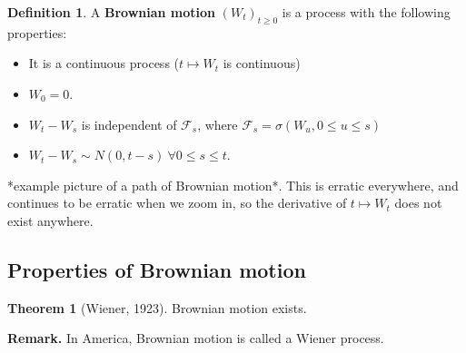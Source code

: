 \documentclass{article}
\theoremstyle{definition}
\newtheorem{theorem}{Theorem}[section]
\newtheorem{defn}{Definition}[section]
\begin{document}
\begin{defn}
    A \textbf{Brownian motion} $(W_t)_{t\ge 0}$ is a process with the following properties:
    \begin{itemize}
        \item It is a continuous process ($t \mapsto W_t$ is continuous)
        \item $W_0=0$.
        \item $W_t - W_s$ is independent of $\mathcal{F}_s$, where $\mathcal{F}_s=\sigma(W_u,  0\le u\le s)$
        \item $W_t-W_s \sim N(0,t-s) ~\forall 0\le s\le t$.
    \end{itemize}
\end{defn}

*example picture of a path of Brownian motion*. This is erratic everywhere, and continues to be erratic when we zoom in, so the derivative of $t \mapsto W_t$ does not exist anywhere.


\subsection{Properties of Brownian motion}

\begin{theorem}[Wiener, 1923]
    Brownian motion exists.
\end{theorem}
\textbf{Remark.} In America, Brownian motion is called a Wiener process.
\end{document}
